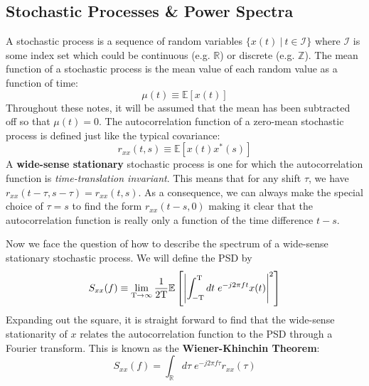 \documentclass[twocolumn]{gwclass}
\newcommand{\R}{\mathbb{R}}
\begin{document}
\subsection{Stochastic Processes \& Power Spectra}
A stochastic process is a sequence of random variables  $\{x(t)\:|\:t\in\mathcal{I}\}$ where $\mathcal{I}$ is some index set which could be continuous (e.g. $\R$) or discrete (e.g. $\mathbb{Z}$). The mean function of a stochastic process is the mean value of each random value as a function of time:
$$ \mu(t) \equiv \mathbb{E}[x(t)] $$
Throughout these notes, it will be assumed that the mean has been subtracted off so that $\mu(t)=0$. The autocorrelation function of a zero-mean stochastic process is defined just like the typical covariance:
$$ r_{xx}(t,s)\equiv\mathbb{E}[x(t)x^*(s)] $$
A \textbf{wide-sense stationary} stochastic process is one for which the autocorrelation function is \emph{time-translation invariant}. This means that for any shift $\tau$, we have $ r_{xx}(t-\tau,s-\tau) = r_{xx}(t,s) $. As a consequence, we can always make the special choice of $\tau=s$ to find the form $r_{xx}(t-s,0)$ making it clear that the autocorrelation function is really only a function of the time difference $t-s$. 


Now we face the question of how to describe the spectrum of a wide-sense stationary stochastic process. We will define the PSD by
$$ S_{xx}(f) \equiv \lim_{\text{\normalfont{T}}\to\infty}\frac{1}{2\text{\normalfont{T}}}\mathbb{E}\left[\abs{\int_{-\text{\normalfont{T}}}^{\text{\normalfont{T}}} dt\;e^{-j2\pi f t}x(t)}^2\right] $$
Expanding out the square, it is straight forward to find that the wide-sense stationarity of $x$ relates the autocorrelation function to the PSD through a Fourier transform. This is known as the \textbf{Wiener-Khinchin Theorem}:
$$ S_{xx}(f) = \int_\R d\tau\;e^{-j2\pi f\tau}r_{xx}(\tau)$$
\end{document}
